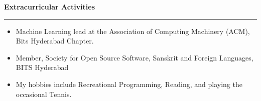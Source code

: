 \documentclass[a4paper,12pt]{report}
\begin{document}
\noindent
\textbf{Extracurricular Activities} \par
\vspace{2pt}
\hrule
\vspace{6pt}
\begin{itemize}[left=0pt, noitemsep, topsep=0pt]
    \item {\fontsize{12pt}{12pt} Machine Learning lead at the Association of Computing Machinery (ACM), Bits Hyderabad Chapter.}
    \item {\fontsize{12pt}{12pt}\selectfont Member, Society for Open Source Software, Sanskrit and Foreign Languages, BITS Hyderabad} \par
    \item {\fontsize{12pt}{12pt}\selectfont My hobbies include Recreational Programming, Reading, and playing the occasional Tennis.} \par
\end{itemize}
\end{document}
